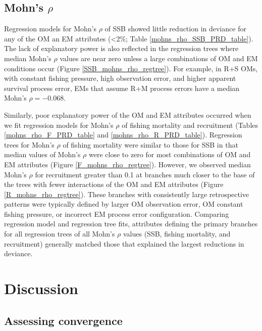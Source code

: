 \documentclass[
  12pt,
]{article}
\begin{document}
\subsection*{\texorpdfstring{Mohn's
\(\rho\)}{Mohn's \textbackslash rho}}\label{mohns-rho-1}

Regression models for Mohn's \(\rho\) of SSB showed little reduction in
deviance for any of the OM an EM attributes (\textless2\%; Table
\ref{mohns_rho_SSB_PRD_table}). The lack of explanatory power is also
reflected in the regression trees where median Mohn's \(\rho\) values
are near zero unless a large combinations of OM and EM conditions occur
(Figure \ref{SSB_mohns_rho_regtree}). For example, in R+S OMs, with
constant fishing pressure, high observation error, and higher apparent
survival process error, EMs that assume R+M process errors have a median
Mohn's \(\rho = -0.068\).

Similarly, poor explanatory power of the OM and EM attributes occurred
when we fit regression models for Mohn's \(\rho\) of fishing mortality
and recruitment (Tables \ref{mohns_rho_F_PRD_table} and
\ref{mohns_rho_R_PRD_table}). Regression trees for Mohn's \(\rho\) of
fishing mortality were similar to those for SSB in that median values of
Mohn's \(\rho\) were close to zero for most combinations of OM and EM
attributes (Figure \ref{F_mohns_rho_regtree}). However, we observed
median Mohn's \(\rho\) for recruitment greater than 0.1 at branches much
closer to the base of the trees with fewer interactions of the OM and EM
attributes (Figure \ref{R_mohns_rho_regtree}). These branches with
consistently large retrospective patterns were typically defined by
larger OM observation error, OM constant fishing pressure, or incorrect
EM process error configuration. Comparing regression model and
regression tree fits, attributes defining the primary branches for all
regression trees of all Mohn's \(\rho\) values (SSB, fishing mortality,
and recruitment) generally matched those that explained the largest
reductions in deviance.

\section*{Discussion}\label{discussion}

\subsection*{Assessing convergence}\label{assessing-convergence}
\end{document}
